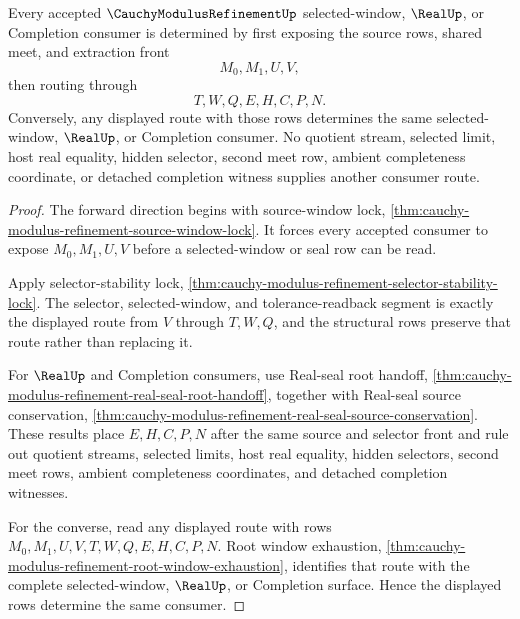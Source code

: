 \begin{theorem}
\label{thm:cauchy-modulus-refinement-source-window-totality}
Every accepted $\CauchyModulusRefinementUp$ selected-window, $\RealUp$, or Completion consumer is determined by first exposing the source rows, shared meet, and extraction front
$$
M_0,M_1,U,V,
$$
then routing through
$$
T,W,Q,E,H,C,P,N.
$$
Conversely, any displayed route with those rows determines the same selected-window, $\RealUp$, or Completion consumer. No quotient stream, selected limit, host real equality, hidden selector, second meet row, ambient completeness coordinate, or detached completion witness supplies another consumer route.
\end{theorem}
\begin{proof}
The forward direction begins with source-window lock, \autoref{thm:cauchy-modulus-refinement-source-window-lock}. It forces every accepted consumer to expose $M_0,M_1,U,V$ before a selected-window or seal row can be read.

Apply selector-stability lock, \autoref{thm:cauchy-modulus-refinement-selector-stability-lock}. The selector, selected-window, and tolerance-readback segment is exactly the displayed route from $V$ through $T,W,Q$, and the structural rows preserve that route rather than replacing it.

For $\RealUp$ and Completion consumers, use Real-seal root handoff, \autoref{thm:cauchy-modulus-refinement-real-seal-root-handoff}, together with Real-seal source conservation, \autoref{thm:cauchy-modulus-refinement-real-seal-source-conservation}. These results place $E,H,C,P,N$ after the same source and selector front and rule out quotient streams, selected limits, host real equality, hidden selectors, second meet rows, ambient completeness coordinates, and detached completion witnesses.

For the converse, read any displayed route with rows $M_0,M_1,U,V,T,W,Q,E,H,C,P,N$. Root window exhaustion, \autoref{thm:cauchy-modulus-refinement-root-window-exhaustion}, identifies that route with the complete selected-window, $\RealUp$, or Completion surface. Hence the displayed rows determine the same consumer.
\end{proof}

